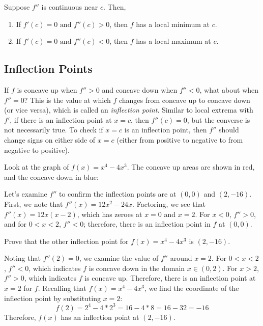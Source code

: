 Suppose $f''$ is continuous near $c$. Then,
\begin{enumerate}
\item If $f'(c) = 0 \text{ and } f''(c)>0$, then $f$ has a local minimum at $c$.
\item If $f'(c) =0 \text{ and } f''(c)<0$, then $f$ has a local maximum at $c$. 
\end{enumerate}

\subsection{Inflection Points}
If $f$ is concave up when $f''>0$ and concave down when $f''<0$, what about when $f''=0$? This is the value at which $f$ changes from concave up to concave down (or vice versa), which is called an \textit{inflection point}. Similar to local extrema with $f'$, if there is an inflection point at $x=c$, then $f''(c)=0$, but the converse is not necessarily true. To check if $x=c$ is an inflection point, then $f''$ should change signs on either side of $x=c$ (either from positive to negative to from negative to positive). 

Look at the graph of $f(x) = x^4-4x^3$. The concave up areas are shown in red, and the concave down in blue:

\begin{figure}[htbp]
\centering
{}
\end{figure}
Let's examine $f''$ to confirm the inflection points are at $(0, 0)$ and $(2, -16)$. First, we note that $f''(x) = 12x^2-24x$. Factoring, we see that $f''(x) = 12x(x-2)$, which has zeroes at $x=0$ and $x=2$. For $x<0$, $f''>0$, and for $0<x<2$, $f''<0$; therefore, there is an inflection point in $f$ at $(0, 0)$. 

\begin{Exercise}[label=concavity1]
Prove that the other inflection point for $f(x) = x^4-4x^3$ is $(2, -16)$.
\end{Exercise}

\begin{Answer}[ref=concavity1]
Noting that $f''(2)=0$, we examine the value of $f''$ around $x=2$. For $0<x<2$, $f''<0$, which indicates $f$ is concave down in the domain $x \in (0,2)$. For $x>2$, $f''>0$, which indicates $f$ is concave up. Therefore, there is an inflection point at $x=2$ for $f$. Recalling that $f(x) = x^4-4x^3$, we find the coordinate of the inflection point by substituting $x=2$:
$$f(2) = 2^4-4*2^3=16-4*8=16-32=-16$$
Therefore, $f(x)$ has an inflection point at $(2, -16)$.
\end{Answer}

